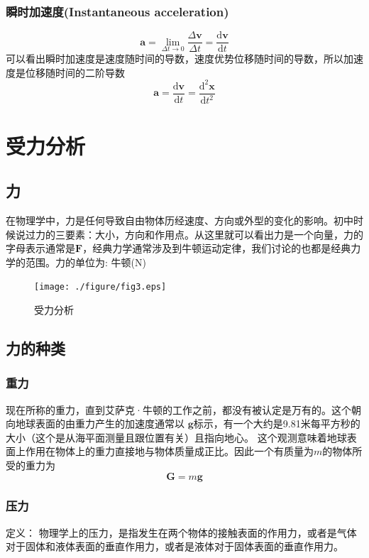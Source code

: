 \documentclass[a4paper,oneside,11pt]{article}
\newcommand{\bol}[1]{\textbf{#1}}
\newcommand{\diff}{\mathrm{d}}
\begin{document}
\subsubsection{瞬时加速度(Instantaneous acceleration)}
\begin{displaymath}
	\bol{a} = \lim_{\Delta t \to 0} \frac{\Delta \bol{v}}{\Delta t} = \frac{\diff \bol{v}}{\diff t}
\end{displaymath}
可以看出瞬时加速度是速度随时间的导数，速度优势位移随时间的导数，所以加速度是位移随时间的二阶导数
\begin{displaymath}
	\bol{a} = \frac{\diff \bol{v}}{\diff t} = \frac{\diff^2 \bol{x}}{\diff t^2}
\end{displaymath}
\newpage
\section{受力分析}
\subsection{力}
在物理学中，力是任何导致自由物体历经速度、方向或外型的变化的影响。初中时候说过力的三要素：大小，方向和作用点。从这里就可以看出力是一个向量，力的字母表示通常是$\bol{F}$，经典力学通常涉及到牛顿运动定律，我们讨论的也都是经典力学的范围。力的单位为: 牛顿(N)
\begin{figure}[!h]
\centering
\texttt{[image: ./figure/fig3.eps]}
\caption{\label{fig3}受力分析}
\end{figure}
\subsection{力的种类}
\subsubsection{重力}
现在所称的重力，直到艾萨克·牛顿的工作之前，都没有被认定是万有的。这个朝向地球表面的由重力产生的加速度通常以 $\bol{g}$标示，有一个大约是9.81米每平方秒的大小（这个是从海平面测量且跟位置有关）且指向地心。 这个观测意味着地球表面上作用在物体上的重力直接地与物体质量成正比。因此一个有质量为$m$的物体所受的重力为
\begin{displaymath}
	\bol{G} = m\bol{g}
\end{displaymath}
\subsubsection{压力}
定义： 物理学上的压力，是指发生在两个物体的接触表面的作用力，或者是气体对于固体和液体表面的垂直作用力，或者是液体对于固体表面的垂直作用力。
\end{document}
